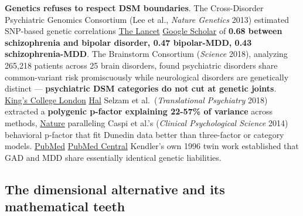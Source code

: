 \textbf{Genetics refuses to respect DSM boundaries}. The Cross-Disorder Psychiatric Genomics Consortium (Lee et al., \emph{Nature Genetics} 2013) estimated SNP-based genetic correlations \href{https://www.thelancet.com/journals/lancet/article/PIIS0140-6736(12)62129-1/abstract}{The Lancet} \href{https://scholar.google.com/scholar_lookup?hl=en&volume=381&publication_year=2013&pages=1371-1379&journal=Lancet&author=Cross-Disorder+Group+of+the+Psychiatric+Genomics+Consortium&title=Identification+of+risk+loci+with+shared+effects+on+five+major+psychiatric+disorders:+A+genome-wide+analysis}{Google Scholar} of \textbf{0.68 between schizophrenia and bipolar disorder, 0.47 bipolar-MDD, 0.43 schizophrenia-MDD}. The Brainstorm Consortium (\emph{Science} 2018), analyzing 265,218 patients across 25 brain disorders, found psychiatric disorders share common-variant risk promiscuously while neurological disorders are genetically distinct --- \textbf{psychiatric DSM categories do not cut at genetic joints}. \href{https://kclpure.kcl.ac.uk/portal/en/publications/analysis-of-shared-heritability-in-common-disorders-of-the-brain/}{King's College London} \href{https://cea.hal.science/cea-01870483v1/document}{Hal} Selzam et al.~(\emph{Translational Psychiatry} 2018) extracted a \textbf{polygenic p-factor explaining 22-57\% of variance} across methods, \href{https://www.nature.com/articles/s41398-018-0217-4}{Nature} paralleling Caspi et al.'s (\emph{Clinical Psychological Science} 2014) behavioral p-factor that fit Dunedin data better than three-factor or category models. \href{https://pubmed.ncbi.nlm.nih.gov/25360393/}{PubMed} \href{https://pmc.ncbi.nlm.nih.gov/articles/PMC4209412/}{PubMed Central} Kendler's own 1996 twin work established that GAD and MDD share essentially identical genetic liabilities.

\subsection{The dimensional alternative and its mathematical teeth}\label{11_dsm_iii-the-dimensional-alternative-and-its-mathematical-teeth}

